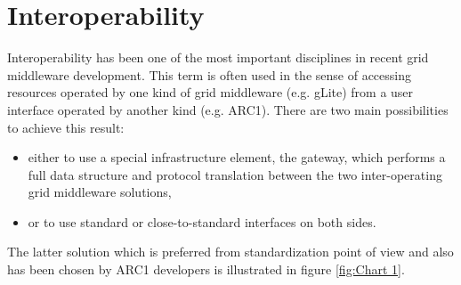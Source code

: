 \documentclass{article}
\begin{document}
\section{Interoperability}
\label{Interoperability}
Interoperability has been one of the most important disciplines in recent grid middleware development. This term is often used in the sense of accessing resources operated by one kind of grid middleware (e.g. gLite) from a user interface operated by another kind (e.g. ARC1). There are two main possibilities to achieve this result:
\begin{itemize}
\item either to use a special infrastructure element, the gateway, which performs a full data structure and protocol translation between the two inter-operating grid middleware solutions,
\item or to use standard or close-to-standard interfaces on both sides.
\end{itemize}
The latter solution which is preferred from standardization point of view and also has been chosen by ARC1 developers is illustrated in figure \ref{fig:Chart 1}.\par
\begin{figure}[ht]
\end{figure}
\end{document}
